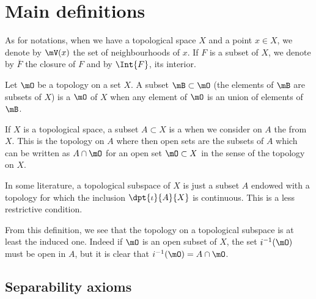 
\section{Main definitions}

As for notations, when we have a topological space $X$ and a point $x\in X$, we denote by $\mV(x)$ the set of neighbourhoods of $x$. If $F$ is a subset of $X$, we denote by $\overline{F}$ the closure of $F$ and by $\Int{F}$, its interior.

\begin{definition}
Let $\mO$ be a topology on a set $X$. A subset $\mB\subset\mO$ (the elements of $\mB$ are subsets of $X$) is a  $\mO$ of $X$ when
any element of $\mO$ is an union of elements of $\mB$.
\end{definition}

\begin{definition}
If $X$ is a topological space, a subset $A\subset X$ is a  when we consider on $A$ the  from $X$. This is the topology on $A$ where then open sets are the subsets of $A$ which can be written as $A\cap\mO$ for an open set $\mO\subset X$ in the sense of the topology on $X$.
\end{definition}

\begin{remark}
In some literature, a topological subspace of $X$ is just a subset $A$ endowed with a topology for which the inclusion $\dpt{\iota}{A}{X}$ is continuous. This is a less restrictive condition.
\end{remark}

From this definition, we see that the topology on a topological subspace is at least the induced one. Indeed if $\mO$ is an open subset of $X$, the set $i^{-1}(\mO)$ must be open in $A$, but it is clear that $i^{-1}(\mO)=A\cap \mO$.

					\subsection{Separability axioms}	


